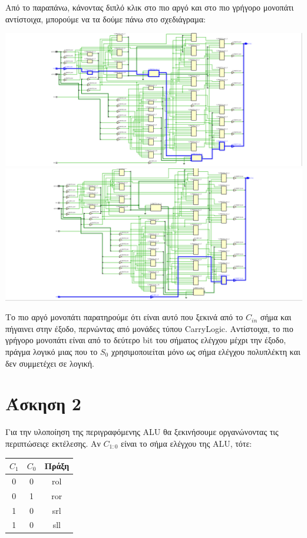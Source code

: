 \documentclass[11pt, a4paper]{report}
\begin{document}
Από το παραπάνω, κάνοντας διπλό κλικ στο πιο αργό και στο πιο γρήγορο μονοπάτι αντίστοιχα, μπορούμε να τα δούμε πάνω στο σχεδιάγραμα:
\begin{center}
	\includegraphics[width=\textwidth]{./images/alu-1/Slowest_Path.png}
	\includegraphics[width=\textwidth]{./images/alu-1/Fastest_Path.png}
\end{center}


Το πιο αργό μονοπάτι παρατηρούμε ότι είναι αυτό που ξεκινά από το $C_{in}$ σήμα και πήγαινει στην έξοδο, περνώντας από μονάδες τύπου CarryLogic.
Αντίστοιχα, το πιο γρήγορο μονοπάτι είναι από το δεύτερο bit του σήματος ελέγχου μέχρι την έξοδο, πράγμα λογικό μιας που το $S_0$ χρησιμοποιείται μόνο ως σήμα ελέγχου πολυπλέκτη και δεν συμμετέχει σε λογική.

\section{Άσκηση 2}
Για την υλοποίηση της περιγραφόμενης ALU θα ξεκινήσουμε οργανώνοντας τις περιπτώσειςε εκτέλεσης.
Αν $C_{1:0}$ είναι το σήμα ελέγχου της ALU, τότε:
\begin{center}
  \begin{tabular}{|c|c|c|}
    \hline
    $C_1$ & $C_0$ & Πράξη \\
    \hline
    0 & 0 & rol \\
    0 & 1 & ror \\
    1 & 0 & srl \\
    1 & 0 & sll \\
    \hline
  \end{tabular}
\end{center}
\end{document}
